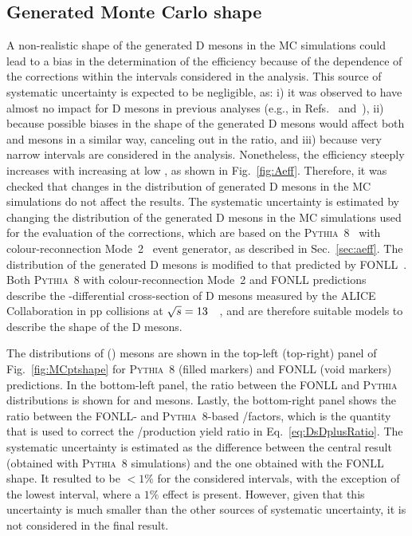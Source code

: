 \subsection{\texorpdfstring{Generated Monte Carlo \pt shape}{Generated Monte Carlo pT shape}}
A non-realistic \pt shape of the generated D mesons in the MC simulations could lead to a bias in the determination of the efficiency because of the \pt dependence of the \aeff corrections within the \pt intervals considered in the analysis. This source of systematic uncertainty is expected to be negligible, as: i) it was observed to have almost no impact for D mesons in previous analyses (e.g., in Refs.~\cite{ALICE:2021mgk} and~\cite{ALICE:2023sgl}), ii) because possible biases in the \pt shape of the generated D mesons would affect both \ds and \dpl mesons in a similar way, canceling out in the ratio, and iii) because very narrow \pt intervals are considered in the analysis. Nonetheless, the efficiency steeply increases with increasing \pt at low \pt, as shown in Fig.~\ref{fig:Aeff}. Therefore, it was checked that changes in the \pt distribution of generated D mesons in the MC simulations do not affect the results. The systematic uncertainty is estimated by changing the \pt distribution of the generated D mesons in the MC simulations used for the evaluation of the \aeff corrections, which are based on the \textsc{Pythia~8}~\cite{Bierlich:2022pfr} with colour-reconnection Mode~2~\cite{Christiansen:2015yqa} event generator, as described in Sec.~\ref{sec:aeff}. The \pt distribution of the generated D mesons is modified to that predicted by FONLL~\cite{Cacciari:1998it}. Both \textsc{Pythia~8} with colour-reconnection Mode~2 and FONLL predictions describe the \pt-differential cross-section of D mesons measured by the ALICE Collaboration in pp collisions at $\sqrt{s}=13$~\tev~\cite{ALICE:2021mgk}, and are therefore suitable models to describe the \pt shape of the D mesons.


The \pt distributions of \ds (\dpl) mesons are shown in the top-left (top-right) panel of Fig.~\ref{fig:MCptshape} for \textsc{Pythia}~8 (filled markers) and FONLL (void markers) predictions. In the bottom-left panel, the ratio between the FONLL and \textsc{Pythia} \pt distributions is shown for \ds and \dpl mesons. Lastly, the bottom-right panel shows the ratio between the FONLL- and \textsc{Pythia}~8-based \aeffpds/\aeffpdpl factors, which is the quantity that is used to correct the \ds/\dpl production yield ratio in Eq.~\ref{eq:DsDplusRatio}. The systematic uncertainty is estimated as the difference between the central result (obtained with \textsc{Pythia}~8 simulations) and the one obtained with the FONLL \pt shape. It resulted to be $<1\%$ for the considered \pt intervals, with the exception of the lowest interval, where a $1\%$ effect is present. However, given that this uncertainty is much smaller than the other sources of systematic uncertainty, it is not considered in the final result.

